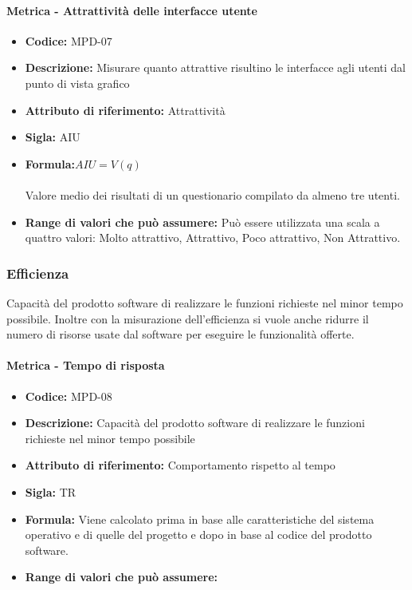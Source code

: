                    \paragraph{Metrica - Attrattività delle interfacce utente} 
                      \begin{itemize}
          \item  \textbf{Codice: } MPD-07
          \item  \textbf{Descrizione:} Misurare quanto attrattive risultino le interfacce agli utenti dal punto di vista grafico 
          \item  \textbf{Attributo di riferimento:} Attrattività
          \item  \textbf{Sigla:} AIU
           \item \textbf{Formula:}\begin{math}AIU = V (q) \end{math}\\ \\
             Valore medio dei risultati di un questionario compilato da almeno tre utenti.
          \item \textbf{Range di valori che può assumere:} Può essere utilizzata una scala a quattro valori: Molto attrattivo, Attrattivo, Poco attrattivo, Non Attrattivo.
           \end{itemize}
           
 \subsubsection{Efficienza}
 Capacità del prodotto software di realizzare le funzioni richieste nel minor tempo possibile. Inoltre con la misurazione dell’efficienza si vuole anche ridurre il numero di risorse usate dal software per eseguire le funzionalità offerte.
 
            \paragraph{Metrica - Tempo di risposta } 
               \begin{itemize}
          \item  \textbf{Codice:} MPD-08
          \item  \textbf{Descrizione:} Capacità del prodotto software di realizzare le funzioni richieste nel minor tempo possibile
         \item   \textbf{Attributo di riferimento:} Comportamento rispetto al tempo
         \item   \textbf{Sigla:} TR
         \item   \textbf{Formula:} Viene calcolato prima in base alle caratteristiche del sistema operativo e di quelle del progetto e dopo in base al codice del prodotto software.
         \item  \textbf{Range di valori che può assumere:}
            \end{itemize}
            
